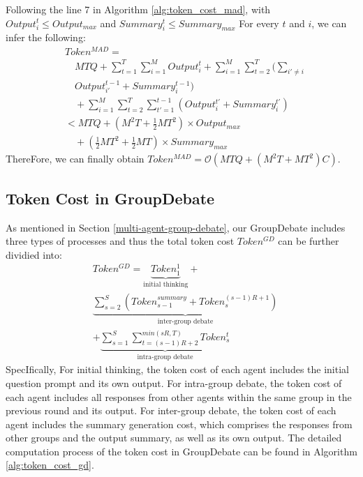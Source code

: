 Following the line 7 in Algorithm \ref{alg:token_cost_mad}, with $Output_i^{t} \leq Output_{max}$ and $Summary_i^{t} \leq Summary_{max}$ For every $t$ and $i$, we can infer the following:
\begin{equation}
\begin{aligned} 
    &Token^{MAD} = \\
    &\quad MTQ + \sum_{t=1}^{T}\sum_{i=1}^{M}Output_i^t + \sum_{i=1}^{M}\sum_{t=2}^{T}(\sum_{i' \neq i} \\
    & \quad Output_{i'}^{t-1} +Summary_i^{t-1})\\ 
    & \quad + \sum_{i=1}^{M}\sum_{t=2}^{T}\sum_{t'=1}^{t-1}(Output_i^{t'}+Summary_i^{t'}) \\ 
    & < MTQ + (M^2T+\frac{1}{2}MT^2)\times Output_{max} \\
    & \quad + (\frac{1}{2}MT^2+\frac{1}{2}MT)\times Summary_{max}
\end{aligned}
\end{equation}
ThereFore, we can finally obtain $Token^{MAD} = \mathcal{O}\left(MTQ+(M^2T+MT^2)C\right)$.



\subsection{Token Cost in GroupDebate} \label{appendix:token-cost-gd}
As mentioned in Section \ref{multi-agent-group-debate}, our GroupDebate includes three types of processes and thus the total token cost $Token^{GD}$ can be further dividied into:
\begin{equation}
\begin{aligned} 
    &Token^{GD} = \underbrace{Token_1^1}_\text{initial thinking} + \\ 
    &\underbrace{\sum_{s=2}^{S}(Token^{summary}_{s-1}+Token_s^{(s-1)R+1})}_\text{inter-group debate} \\
    &+ \underbrace{\sum_{s=1}^{S}\sum_{t=(s-1)R+2}^{min(sR,T)}Token_s^t}_\text{intra-group debate}
\end{aligned}
\end{equation}
\label{eq:gd_divide}
SpecIfically, For initial thinking, the token cost of each agent includes the initial question prompt and its own output. For intra-group debate, the token cost of each agent includes all responses from other agents within the same group in the previous round and its output. For inter-group debate, the token cost of each agent includes the summary generation cost, which comprises the responses from other groups and the output summary, as well as its own output. The detailed computation process of the token cost in GroupDebate can be found in Algorithm \ref{alg:token_cost_gd}.

